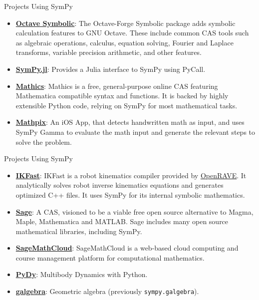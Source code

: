 \documentclass[xcolor=svgnames]{beamer}
\begin{document}
\begin{frame}{Projects Using SymPy}
\begin{itemize}
\item
  \href{http://octave.sourceforge.net/symbolic/}{\textbf{Octave Symbolic}}:
  The Octave-Forge Symbolic package adds symbolic calculation features
  to GNU Octave. These include common CAS tools such
  as algebraic operations, calculus, equation solving, Fourier and
  Laplace transforms, variable precision arithmetic, and other features.
\item
  \href{https://github.com/jverzani/SymPy.jl}{\textbf{SymPy.jl}}:
  Provides a Julia interface to SymPy using PyCall.
\item
  \href{https://mathics.github.io/}{\textbf{Mathics}}: Mathics is a
  free, general-purpose online CAS featuring Mathematica compatible
  syntax and functions. It is backed by highly extensible Python code,
  relying on SymPy for most mathematical tasks.
\item
  \href{http://mathpix.com/}{\textbf{Mathpix}}: An iOS App, that detects handwritten math as input, and uses
  SymPy Gamma to evaluate the math input and generate the relevant
  steps to solve the problem.
\end{itemize}
  \end{frame}

\begin{frame}{Projects Using SymPy}
\begin{itemize}
\item
  \href{http://openrave.org/docs/0.8.2/openravepy/ikfast/}{\textbf{IKFast}}:
  IKFast is a robot kinematics compiler provided by
  \href{http://openrave.org/}{OpenRAVE}. It analytically solves robot inverse
  kinematics equations and generates optimized C++ files. It uses SymPy for
  its internal symbolic mathematics.
\item
  \href{http://www.sagemath.org/}{\textbf{Sage}}: A CAS, visioned to be
  a viable free open source alternative to Magma, Maple, Mathematica and
  MATLAB\@. Sage includes many open source mathematical libraries, including
  SymPy.
\item
  \href{https://cloud.sagemath.com}{\textbf{SageMathCloud}}:
  SageMathCloud is a web-based cloud computing and course management
  platform for computational mathematics.
\item
  \href{http://www.pydy.org/}{\textbf{PyDy}}: Multibody Dynamics with
  Python.
\item
  \href{https://github.com/brombo/galgebra}{\textbf{galgebra}}:
  Geometric algebra (previously \texttt{sympy.galgebra}).
\end{itemize}
\end{frame}
\end{document}
